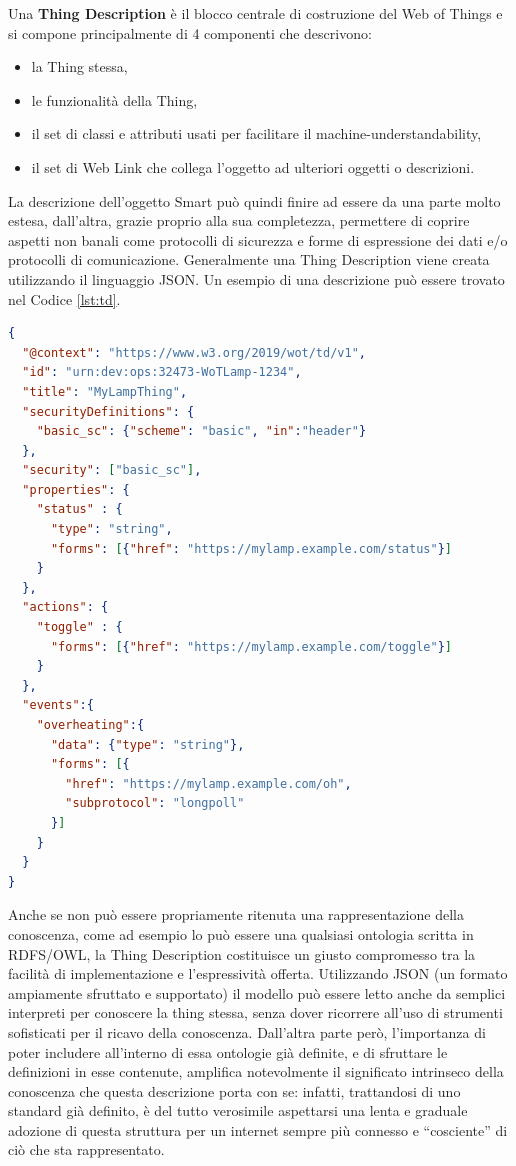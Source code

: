 \documentclass[12pt,a4paper,openright,oneside]{report}
\newcommand{\quotes}[1]{``#1''}
\begin{document}
Una \textbf{Thing Description} \cite{td} è il blocco centrale di costruzione del Web of Things e si compone principalmente di 4 componenti che descrivono: 
\begin{itemize}
	\setlength\itemsep{-0.7em}
	\item la Thing stessa,
	\item le funzionalità della Thing,
	\item il set di classi e attributi usati per facilitare il machine-understandability,
	\item il set di Web Link che collega l'oggetto ad ulteriori oggetti o descrizioni.
\end{itemize}

La descrizione dell'oggetto Smart può quindi finire ad essere da una parte molto estesa, dall'altra, grazie proprio alla sua completezza, permettere di coprire aspetti non banali come protocolli di sicurezza e forme di espressione dei dati e/o protocolli di comunicazione.
Generalmente una Thing Description viene creata utilizzando il linguaggio JSON. Un esempio di una descrizione può essere trovato nel Codice \ref{lst:td}.

\begin{lstlisting}[language=json,caption={Esempio di una Thing Description},label=lst:td]
{
  "@context": "https://www.w3.org/2019/wot/td/v1",
  "id": "urn:dev:ops:32473-WoTLamp-1234",
  "title": "MyLampThing",
  "securityDefinitions": {
    "basic_sc": {"scheme": "basic", "in":"header"}
  },
  "security": ["basic_sc"],
  "properties": {
    "status" : {
      "type": "string",
      "forms": [{"href": "https://mylamp.example.com/status"}]
    }
  },
  "actions": {
    "toggle" : {
      "forms": [{"href": "https://mylamp.example.com/toggle"}]
    }
  },
  "events":{
    "overheating":{
      "data": {"type": "string"},
      "forms": [{
        "href": "https://mylamp.example.com/oh",
        "subprotocol": "longpoll"
      }]
    }
  }
}
\end{lstlisting}

Anche se non può essere propriamente ritenuta una rappresentazione della conoscenza, come ad esempio lo può essere una qualsiasi ontologia scritta in RDFS/OWL, la Thing Description costituisce un giusto compromesso tra la facilità di implementazione e l'espressività offerta. Utilizzando JSON (un formato ampiamente sfruttato e supportato) il modello può essere letto anche da semplici interpreti per conoscere la thing stessa, senza dover ricorrere all'uso di strumenti sofisticati per il ricavo della conoscenza. Dall'altra parte però, l'importanza di poter includere all'interno di essa ontologie già definite, e di sfruttare le definizioni in esse contenute, amplifica notevolmente il significato intrinseco della conoscenza che questa descrizione porta con se: infatti, trattandosi di uno standard già definito, è del tutto verosimile aspettarsi una lenta e graduale adozione di questa struttura per un internet sempre più connesso e \quotes{cosciente} di ciò che sta rappresentato.\\
\end{document}
